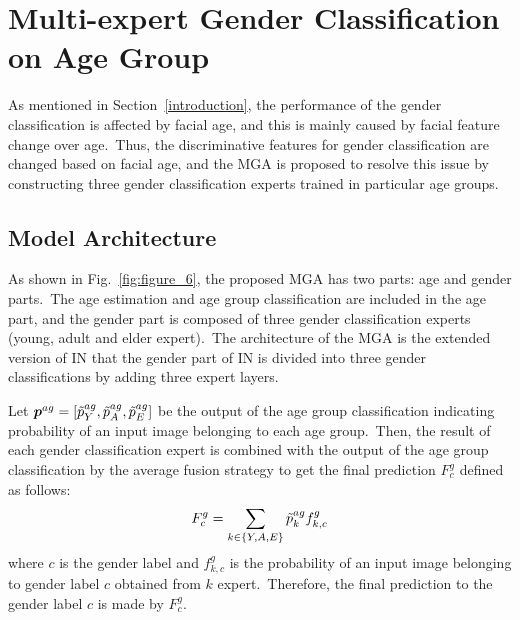 \documentclass[10pt,twocolumn,letterpaper]{article}
\begin{document}
\section{Multi-expert Gender Classification on Age Group}
\label{Multi-expert Gender Classification on Age Group}
As mentioned in Section~\ref{introduction}, the performance of the gender classification is affected by facial age, and this is mainly caused by facial feature change over age.~Thus, the discriminative features for gender classification are changed based on facial age, and the MGA is proposed to resolve this issue by constructing three gender classification experts trained in particular age groups. 

\subsection{Model Architecture}
As shown in Fig.~\ref{fig:figure_6}, the proposed MGA has two parts: age and gender parts.~The age estimation and age group classification are included in the age part, and the gender part is composed of three gender classification experts (young, adult and elder expert).~The architecture of the MGA is the extended version of IN that the gender part of IN is divided into three gender classifications by adding three expert layers. 

Let $\boldsymbol{p}^{ag}=[\Tilde{p}^{ag}_Y, \Tilde{p}^{ag}_A, \Tilde{p}^{ag}_E]$ be the output of the age group classification indicating probability of an input image belonging to each age group.~Then, the result of each gender classification expert is combined with the output of the age group classification by the average fusion strategy to get the final prediction ${F_c^{g}}$ defined as follows:
\begin{equation}
F_c^{g}=\sum_{k\in{\{Y,A,E\}}}\Tilde{p}^{ag}_kf^{g}_{k,c}
\end{equation}
where $c$ is the gender label and $f^{g}_{k,c}$ is the probability of an input image belonging to gender label $c$ obtained from $k$ expert.~Therefore, the final prediction to the gender label $c$ is made by $F_c^{g}$.

\end{document}
